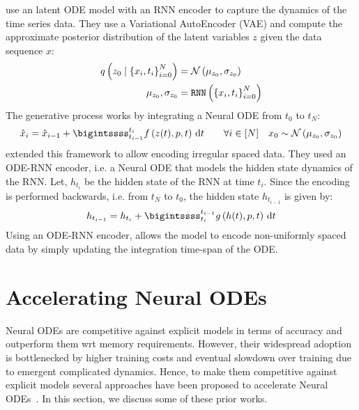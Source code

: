 \citet{chen2018neural} use an latent ODE model with an RNN encoder to capture the dynamics of the time series data. They use a Variational AutoEncoder (VAE) and compute the approximate posterior distribution of the latent variables $z$ given the data sequence $x$:
%
\begin{align}
  q\left(z_0 \mid \left\{x_i, t_i \right\}_{i = 0}^N\right) & = \mathcal{N}\left(\mu_{z_0}, \sigma_{z_0}\right)             \\
  \mu_{z_0}, \sigma_{z_0}                               & = \texttt{RNN}\left(\left\{x_i, t_i \right\}_{i = 0}^N\right)
\end{align}
%
The generative process works by integrating a Neural ODE from $t_0$ to $t_N$:
%
\begin{equation}
  \hat{x}_i = \hat{x}_{i - 1} + \bigintssss_{t_{i - 1}}^{t_i} \func{f}{z(t), p, t} \, \dt \qquad \forall i \in [N] \quad x_0 \sim \func{\mathcal{N}}{\mu_{z_0}, \sigma_{z_0}}
\end{equation}
%
\citet{rubanova2019latent} extended this framework to allow encoding irregular spaced data. They used an ODE-RNN encoder, i.e. a Neural ODE that models the hidden state dynamics of the RNN. Let, $h_{t_i}$ be the hidden state of the RNN at time $t_i$. Since the encoding is performed backwards, i.e. from $t_N$ to $t_0$, the hidden state $h_{t_{i - 1}}$ is given by:
%
\begin{equation}
  h_{t_{i - 1}} = h_{t_i} + \bigintssss_{t_i}^{t_{i - 1}} \func{g}{h(t), p, t} \, \dt
\end{equation}
%
Using an ODE-RNN encoder, allows the model to encode non-uniformly spaced data by simply updating the integration time-span of the ODE.

\section{Accelerating Neural ODEs}
\label{sec:accelerating_neural_odes_prior_works}

Neural ODEs are competitive against explicit models in terms of accuracy and outperform them wrt memory requirements. However, their widespread adoption is bottlenecked by higher training costs and eventual slowdown over training due to emergent complicated dynamics. Hence, to make them competitive against explicit models several approaches have been proposed to accelerate Neural ODEs~\citep{finlay2020train, kelly2020learning, ghosh2020steer, poli2020hypersolvers, kidger2021hey, pal2021opening, xia2021heavy, zhuang2021mali, djeumou2022taylorlagrange, pal2023locally}. In this section, we discuss some of these prior works.

